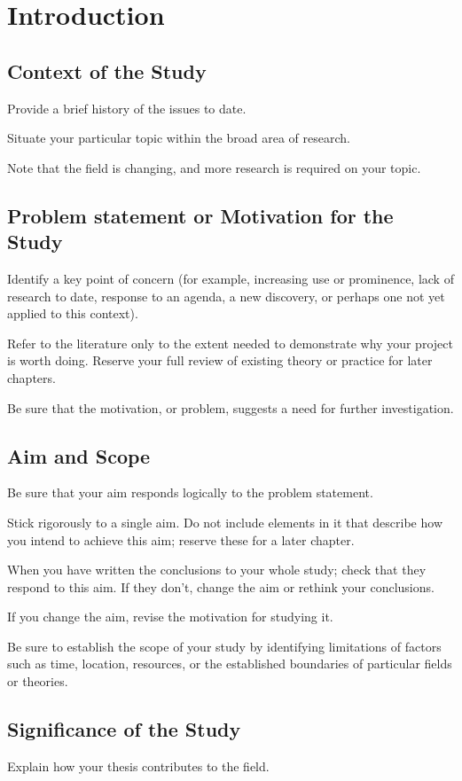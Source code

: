\chapter{Introduction}
\label{chapter:intro}

\section{Context of the Study}	 
Provide a brief history of the issues to date.

Situate your particular topic within the broad area of research.

Note that the field is changing, and more research is required on your topic.
\section{Problem statement or Motivation for the Study}
Identify a key point of concern (for example, increasing use or prominence, lack of research to date, response to an agenda, a new discovery, or perhaps one not yet applied to this context).

Refer to the literature only to the extent needed to demonstrate why your project is worth doing. Reserve your full review of existing theory or practice for later chapters.


Be sure that the motivation, or problem, suggests a need for further investigation.

\section{Aim and Scope}
Be sure that your aim responds logically to the problem statement.

Stick rigorously to a single aim. Do not include elements in it that describe how you intend to achieve this aim; reserve these for a later chapter.

When you have written the conclusions to your whole study; check that they respond to this aim. If they don't, change the aim or rethink your conclusions.

If you change the aim, revise the motivation for studying it.

Be sure to establish the scope of your study by identifying limitations of factors such as time, location, resources, or the established boundaries of particular fields or theories.

\section{Significance of the Study}
Explain how your thesis contributes to the field.

